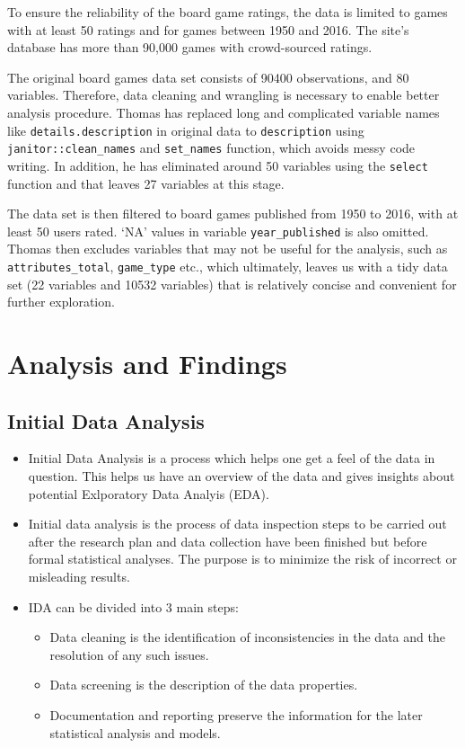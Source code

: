 \documentclass[
]{article}
\providecommand{\tightlist}{%
  \setlength{\itemsep}{0pt}\setlength{\parskip}{0pt}}
\begin{document}
To ensure the reliability of the board game ratings, the data is limited to games with at least 50 ratings and for games between 1950 and 2016. The site's database has more than 90,000 games with crowd-sourced ratings.

The original board games data set consists of 90400 observations, and 80 variables. Therefore, data cleaning and wrangling is necessary to enable better analysis procedure. Thomas has replaced long and complicated variable names like \texttt{details.description} in original data to \texttt{description} using \texttt{janitor::clean\_names} and \texttt{set\_names} function, which avoids messy code writing. In addition, he has eliminated around 50 variables using the \texttt{select} function and that leaves 27 variables at this stage.

The data set is then filtered to board games published from 1950 to 2016, with at least 50 users rated. `NA' values in variable \texttt{year\_published} is also omitted. Thomas then excludes variables that may not be useful for the analysis, such as \texttt{attributes\_total}, \texttt{game\_type} etc., which ultimately, leaves us with a tidy data set (22 variables and 10532 variables) that is relatively concise and convenient for further exploration.

\hypertarget{analysis-and-findings}{%
\section{Analysis and Findings}\label{analysis-and-findings}}

\hypertarget{initial-data-analysis}{%
\subsection{Initial Data Analysis}\label{initial-data-analysis}}

\begin{itemize}
\tightlist
\item
  Initial Data Analysis is a process which helps one get a feel of the data in question. This helps us have an overview of the data and gives insights about potential Exlporatory Data Analyis (EDA).
\item
  Initial data analysis is the process of data inspection steps to be carried out after the research plan and data collection have been finished but before formal statistical analyses. The purpose is to minimize the risk of incorrect or misleading results.
\item
  IDA can be divided into 3 main steps:

  \begin{itemize}
  \tightlist
  \item
    Data cleaning is the identification of inconsistencies in the data and the resolution of any such issues.
  \item
    Data screening is the description of the data properties.
  \item
    Documentation and reporting preserve the information for the later statistical analysis and models.
  \end{itemize}
\end{itemize}
\end{document}
